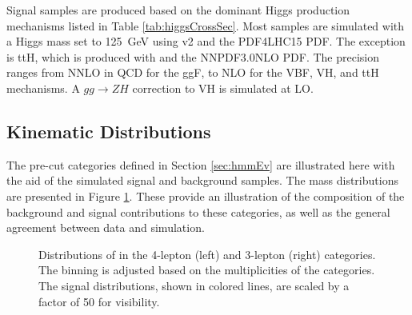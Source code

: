 Signal samples are produced based on the dominant Higgs production mechanisms listed in Table \ref{tab:higgsCrossSec}.
Most samples are simulated with a Higgs mass set to 125~GeV using \powheg v2 and the PDF4LHC15 PDF. 
The exception is ttH, which is produced with \madgraph and the NNPDF3.0NLO PDF.
The precision ranges from NNLO in QCD for the ggF, to NLO for the VBF, VH, and ttH mechanisms.
A $gg\to ZH$ correction to VH is simulated at LO.


\subsection{Kinematic Distributions}\label{sec:hmmKine}

The pre-cut categories defined in Section \ref{sec:hmmEv} are illustrated here with the aid of the simulated signal and background samples.
The mass distributions are presented in Figure \ref{fig:hmmPrecutMassHists}.
These provide an illustration of the composition of the background and signal contributions to these categories, as well as the general agreement between data and simulation. 
\begin{figure}[h!]
\captionsetup[subfigure]{position=b}
\centering
{}
\caption{Distributions of \muu in the 4-lepton (left) and 3-lepton (right) categories. The binning is adjusted based on the multiplicities of the categories. The signal distributions, shown in colored lines, are scaled by a factor of 50 for visibility.}
\label{fig:hmmPrecutMassHists}
\end{figure}

